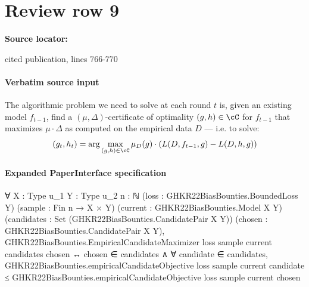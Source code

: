 \documentclass[10pt]{article}
\begin{document}
\section*{Review row 9}
\textbf{Source locator:} {\footnotesize\raggedright cited publication, lines 766-\allowbreak{}770\par}
\paragraph{Verbatim source input}
\begin{ReviewVerbatim}
The algorithmic problem we need to solve at each round $t$ is, given an existing model $f_{t-1}$, find a $(\mu,\Delta)$-certificate of optimality $(g,h) \in \cC$ for $f_{t-1}$ that maximizes $\mu\cdot \Delta$ as computed on the empirical data $D$ --- i.e. to solve:
\begin{equation}
\label{eq:optproblem}
(g_t,h_t) =\arg\max_{(g,h) \in \cC }\mu_{D}(g)\cdot (L(D,f_{t-1},g) - L(D,h,g))
\end{equation}
\end{ReviewVerbatim}



\paragraph{Expanded PaperInterface specification}
\begin{ReviewVerbatim}
∀ {X : Type u_1} {Y : Type u_2} {n : ℕ} (loss : GHKR22BiasBounties.BoundedLoss Y) (sample : Fin n → X × Y)
  (current : GHKR22BiasBounties.Model X Y) (candidates : Set (GHKR22BiasBounties.CandidatePair X Y))
  (chosen : GHKR22BiasBounties.CandidatePair X Y),
  GHKR22BiasBounties.EmpiricalCandidateMaximizer loss sample current candidates chosen ↔
    chosen ∈ candidates ∧
      ∀ candidate ∈ candidates,
        GHKR22BiasBounties.empiricalCandidateObjective loss sample current candidate ≤
          GHKR22BiasBounties.empiricalCandidateObjective loss sample current chosen
\end{ReviewVerbatim}
\end{document}
